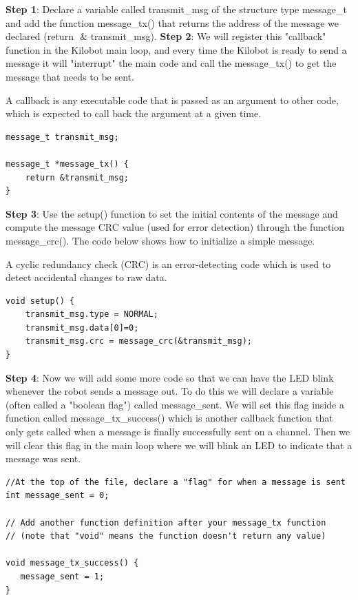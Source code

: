 \noindent \textbf{Step 1}: Declare a variable called transmit\_msg of the structure type message\_t and add the function message\_tx() that returns the address of the message we declared (return $\And$transmit\_msg).
\newline
\newline
 \noindent \textbf{Step 2}: We will register this "callback" function in the Kilobot main loop, and every time the Kilobot is ready to send a message it will "interrupt" the main code and call the message\_tx() to get the message that needs to be sent.\par
 A callback is any executable code that is passed as an argument to other code, which is expected to call back the argument at a given time.
\begin{verbatim}
message_t transmit_msg;

message_t *message_tx() {
    return &transmit_msg;
} 

\end{verbatim}
\noindent \textbf{Step 3}:
 Use the setup() function to set the initial contents of the message and compute the message CRC value (used for error detection) through the function message\_crc(). The code below shows how to initialize a simple message. \par
 A cyclic redundancy check (CRC) is an error-detecting code which is used to detect accidental changes to raw data.
\begin{verbatim}
void setup() {
    transmit_msg.type = NORMAL;
    transmit_msg.data[0]=0;
    transmit_msg.crc = message_crc(&transmit_msg);
}
\end{verbatim}

\noindent \textbf{Step 4}:
 Now we will add some more code so that we can have the LED blink whenever the robot sends a message out. To do this we will declare a variable (often called a "boolean flag") called message\_sent. We will set this flag inside a function called message\_tx\_success() which is another callback function that only gets called when a message is finally successfully sent on a channel. Then we will clear this flag in the main loop where we will blink an LED to indicate that a message was sent. 
\begin{verbatim}
//At the top of the file, declare a "flag" for when a message is sent
int message_sent = 0;

// Add another function definition after your message_tx function
// (note that "void" means the function doesn't return any value)

void message_tx_success() {
   message_sent = 1;
}
\end{verbatim}

